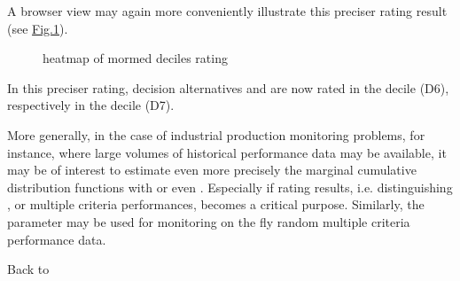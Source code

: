 \documentclass[a4paper,12pt,english]{sphinxhowto}
\let\sphinxpxdimen\pdfpxdimen\else\newdimen\sphinxpxdimen
\begin{document}
A browser view may again more conveniently illustrate this preciser  rating result (see \hyperref[\detokenize{tutorial:heatmap2}]{Fig.\@ \ref{\detokenize{tutorial:heatmap2}}}).

\begin{sphinxVerbatim}[commandchars=\\\{\},numbers=left,firstnumber=1,stepnumber=1]
\PYGZbs{}
                           
\end{sphinxVerbatim}

\begin{figure}[H]
\centering
\capstart

\noindent\sphinxincludegraphics[width=400\sphinxpxdimen]{{heatMap2}.png}
\caption{heatmap of mormed deciles rating}\label{\detokenize{tutorial:heatmap2}}\end{figure}

In this preciser  rating, decision alternatives  and  are now rated in the  decile (D6), respectively in the  decile (D7).

More generally, in the case of industrial production monitoring problems, for instance, where large volumes of historical performance data may be available, it may be of interest to estimate even more precisely the marginal cumulative distribution functions with  or even . Especially if  rating results, i.e. distinguishing , or  multiple criteria performances, becomes a critical purpose. Similarly, the  parameter may be used for monitoring on the fly  random multiple criteria performance data.

Back to {\hyperref[\detokenize{tutorial:tutorial-label}]{}}
\end{document}
